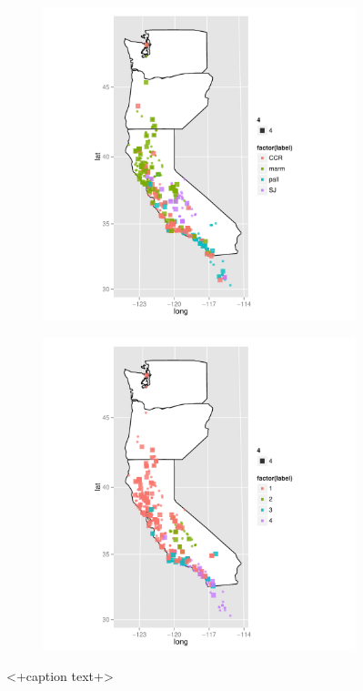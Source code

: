 \documentclass{article}\usepackage{graphicx, color}
\begin{document}
\begin{figure}[t]
  \begin{subfigure}[b]{0.5\textwidth}
    \centering
    \caption{}
    \includegraphics[width = \textwidth]{figure/multi-map3}
    \label{fig:multi-map3}
  \end{subfigure}%
  \begin{subfigure}[b]{0.5\textwidth}
    \centering
    \caption{}
    \includegraphics[width = \textwidth]{figure/multi-map4}
    \label{fig:multi-map4}
  \end{subfigure}
  \caption{<+caption text+>}
  \label{fig:multi-map}
\end{figure}
\end{document}

